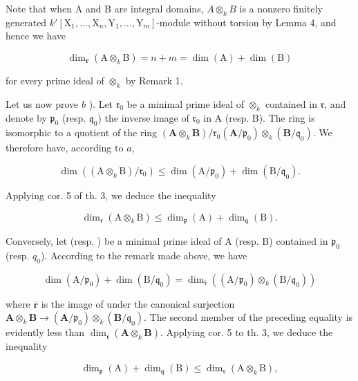 Note that when A and B are integral domains, \(A \otimes_k B\) is a nonzero finitely generated \(k'[\mathrm{X}_{1}, \ldots, \mathrm{X}_{n}, \mathrm{Y}_{1}, \ldots, \mathrm{Y}_{m}]\)-module without torsion by Lemma 4, and hence we have

\[
\dim_ {\mathbf {r}} (\mathrm{A} \otimes_ {k} \mathrm{B}) = n + m = \dim (\mathrm{A}) + \dim (\mathrm{B})
\]

for every prime ideal  of \(\otimes_{k}\) by Remark 1.

Let us now prove \(b\) ). Let \(\mathfrak{r}_{0}\) be a minimal prime ideal of \(\otimes_{k}\) contained in \(\mathfrak{r}\), and denote by \(\mathfrak{p}_{0}\) (resp. \(\mathfrak{q}_{0}\)) the inverse image of \(\mathfrak{r}_{0}\) in A (resp. B). The ring  is isomorphic to a quotient of the ring \((\mathbf{A} \otimes_k \mathbf{B}) / \mathfrak{r}_{0}\)\((\mathbf{A} / \mathfrak{p}_{0}) \otimes_k (\mathbf{B} / \mathfrak{q}_{0})\). We therefore have, according to \(a\),

\[
\dim \left(\left(\mathrm{A} \otimes_ {k} \mathrm{B}\right) / \mathfrak {r} _ {0}\right) \leqslant \dim (\mathrm{A} / \mathfrak {p} _ {0}) + \dim (\mathrm{B} / \mathfrak {q} _ {0}).
\]

Applying cor. 5 of th. 3, we deduce the inequality

\[
\dim_ {\mathfrak {r}} (\mathrm{A} \otimes_ {k} \mathrm{B}) \leqslant \dim_ {\mathfrak {p}} (\mathrm{A}) + \dim_ {\mathfrak {q}} (\mathrm{B}).
\]

Conversely, let  (resp. ) be a minimal prime ideal of A (resp. B) contained in \(\mathfrak{p}_{0}\) (resp. \(q_{0}\)). According to the remark made above, we have

\[
\dim (\mathrm{A} / \mathfrak {p} _ {0}) + \dim (\mathrm{B} / \mathfrak {q} _ {0}) = \dim_ {\overline {{\mathfrak {r}}}} ((\mathrm{A} / \mathfrak {p} _ {0}) \otimes_ {k} (\mathrm{B} / \mathfrak {q} _ {0}))
\]

where \(\overline{\mathbf{r}}\) is the image of  under the canonical surjection \(\mathbf{A} \otimes_{k} \mathbf{B} \to (\mathbf{A}/\mathfrak{p}_{0}) \otimes_{k} (\mathbf{B}/\mathfrak{q}_{0})\). The second member of the preceding equality is evidently less than \(\dim_{\mathfrak{r}}(\mathbf{A} \otimes_{k} \mathbf{B})\). Applying cor. 5 to th. 3, we deduce the inequality

\[
\dim_ {\mathfrak {p}} (\mathrm{A}) + \dim_ {\mathfrak {q}} (\mathrm{B}) \leqslant \dim_ {\mathfrak {r}} (\mathrm{A} \otimes_ {k} \mathrm{B}),
\]

